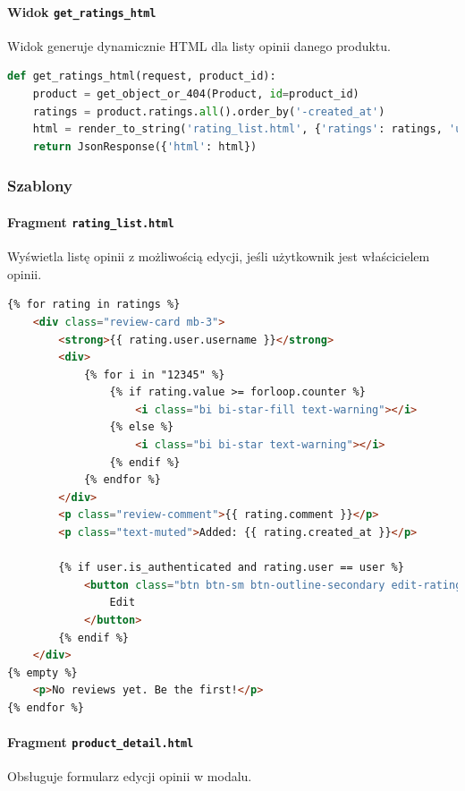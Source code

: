 \documentclass[12pt,a4paper,oneside]{article}
\theoremstyle{definition}
\numberwithin{equation}{section}
\begin{document}
\paragraph{Widok \texttt{get\_ratings\_html}}
Widok generuje dynamicznie HTML dla listy opinii danego produktu.

\begin{lstlisting}[language=Python, caption=Widok \texttt{get\_ratings\_html}]
def get_ratings_html(request, product_id):
    product = get_object_or_404(Product, id=product_id)
    ratings = product.ratings.all().order_by('-created_at')
    html = render_to_string('rating_list.html', {'ratings': ratings, 'user': request.user})
    return JsonResponse({'html': html})
\end{lstlisting}



\subsubsection{Szablony}

\paragraph{Fragment \texttt{rating\_list.html}}
Wyświetla listę opinii z możliwością edycji, jeśli użytkownik jest właścicielem opinii.

\begin{lstlisting}[language=HTML, caption=Szablon \texttt{rating\_list.html}]
{% for rating in ratings %}
    <div class="review-card mb-3">
        <strong>{{ rating.user.username }}</strong>
        <div>
            {% for i in "12345" %}
                {% if rating.value >= forloop.counter %}
                    <i class="bi bi-star-fill text-warning"></i>
                {% else %}
                    <i class="bi bi-star text-warning"></i>
                {% endif %}
            {% endfor %}
        </div>
        <p class="review-comment">{{ rating.comment }}</p>
        <p class="text-muted">Added: {{ rating.created_at }}</p>

        {% if user.is_authenticated and rating.user == user %}
            <button class="btn btn-sm btn-outline-secondary edit-rating-btn" data-rating-id="{{ rating.id }}">
                Edit
            </button>
        {% endif %}
    </div>
{% empty %}
    <p>No reviews yet. Be the first!</p>
{% endfor %}
\end{lstlisting}

\paragraph{Fragment \texttt{product\_detail.html}}
Obsługuje formularz edycji opinii w modalu.
\end{document}

